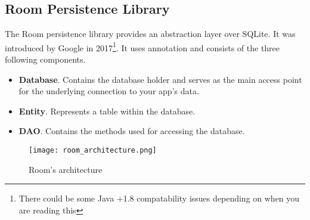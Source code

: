 \subsection{Room Persistence Library}
The Room persistence library provides an abstraction layer over SQLite. It was introduced by Google in 2017\footnote{There could be some Java +1.8 compatability issues depending on when you are reading this}. It uses annotation and consists of the three following components.

\begin{itemize}
\item \textbf{Database}. Contains the database holder and serves as the main access point for the underlying connection to your app's data.
\item \textbf{Entity}. Represents a table within the database.
\item \textbf{DAO}. Contains the methods used for accessing the database.
\end{itemize}

\begin{figure}[H]
\centering
\texttt{[image: room\_architecture.png]}
\caption{Room's architecture}
\label{fig:roomarch}
\end{figure}

